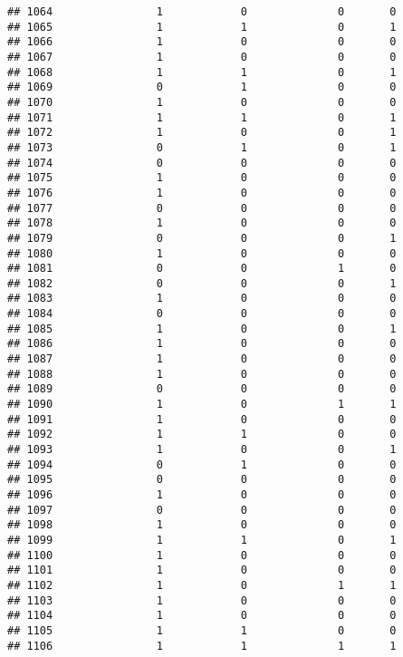 \documentclass[]{article}
\begin{document}
\begin{verbatim}
## 1064                1            0              0       0
## 1065                1            1              0       1
## 1066                1            0              0       0
## 1067                1            0              0       0
## 1068                1            1              0       1
## 1069                0            1              0       0
## 1070                1            0              0       0
## 1071                1            1              0       1
## 1072                1            0              0       1
## 1073                0            1              0       1
## 1074                0            0              0       0
## 1075                1            0              0       0
## 1076                1            0              0       0
## 1077                0            0              0       0
## 1078                1            0              0       0
## 1079                0            0              0       1
## 1080                1            0              0       0
## 1081                0            0              1       0
## 1082                0            0              0       1
## 1083                1            0              0       0
## 1084                0            0              0       0
## 1085                1            0              0       1
## 1086                1            0              0       0
## 1087                1            0              0       0
## 1088                1            0              0       0
## 1089                0            0              0       0
## 1090                1            0              1       1
## 1091                1            0              0       0
## 1092                1            1              0       0
## 1093                1            0              0       1
## 1094                0            1              0       0
## 1095                0            0              0       0
## 1096                1            0              0       0
## 1097                0            0              0       0
## 1098                1            0              0       0
## 1099                1            1              0       1
## 1100                1            0              0       0
## 1101                1            0              0       0
## 1102                1            0              1       1
## 1103                1            0              0       0
## 1104                1            0              0       0
## 1105                1            1              0       0
## 1106                1            1              1       1

\end{verbatim}
\end{document}
